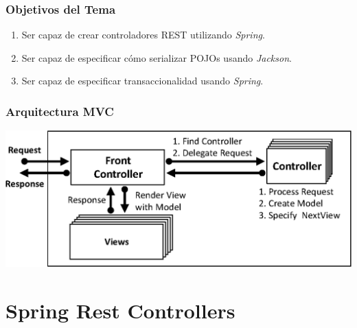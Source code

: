 \documentclass[a4paper,slidestop,xcolor=pst,blue]{beamer}
\begin{document}
\begin{frame}[c]
    \frametitle{Objetivos del Tema}
    \begin{enumerate}[<+->]
         \item Ser capaz de crear controladores REST utilizando \emph{Spring}.
         \item Ser capaz de especificar cómo serializar POJOs usando \emph{Jackson}.
         \item Ser capaz de especificar transaccionalidad usando \emph{Spring}.
    \end{enumerate}
\end{frame}

%
%

\begin{frame}[c]
    \frametitle{Arquitectura MVC}
    \begin{center}
        \includegraphics[width=\linewidth,keepaspectratio=true]{images/mvc/mvc00.eps}
    \end{center}
\end{frame}

\section{Spring Rest Controllers}
\end{document}
